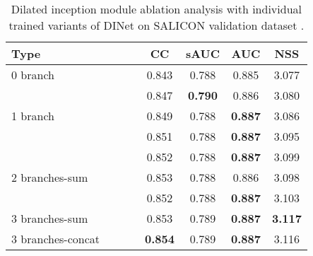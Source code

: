 \begin{table}[]
	\centering
	\scriptsize
	
	\caption{
Dilated inception module ablation analysis with individual trained variants of DINet on SALICON validation dataset \cite{jiang2015salicon}.
	} 
	\label{table:dimaa2}
	\begin{tabular}{|l|ccc|cccc|}
		\hline
		Type                            &  &  & & CC    & sAUC  & AUC   & NSS   \\ \hline
		0 branch                &    &    &    &  0.843  & 0.788 & 0.885 & 3.077 \\ \hline
		
		\multirow{3}{*}{1 branch}       & \checkmark   &    &    & 0.847 & \textbf{0.790}  & 0.886 & 3.080  \\ \cline{2-8} 
		&    & \checkmark   &    & 0.849 & 0.788 & \textbf{0.887} & 3.086 \\ \cline{2-8} 
		&    &    & \checkmark   & 0.851 & 0.788 & \textbf{0.887} & 3.095 \\ \hline
		\multirow{3}{*}{2 branches-sum} & \checkmark   & \checkmark   &    & 0.852 & 0.788 & \textbf{0.887} & 3.099 \\ \cline{2-8} 
		& \checkmark   &    & \checkmark   & 0.853 & 0.788 & 0.886 & 3.098 \\ \cline{2-8} 
		&    & \checkmark   & \checkmark   & 0.852 & 0.788 & \textbf{0.887} & 3.103 \\ \hline
		3 branches-sum                  & \checkmark   & \checkmark   & \checkmark   & 0.853 & 0.789 & \textbf{0.887} & \textbf{3.117} \\ \hline
		3 branches-concat               & \checkmark   & \checkmark   & \checkmark   & \textbf{0.854} & 0.789 & \textbf{0.887} & 3.116 \\ \hline 
\end{tabular}
\vspace{-4mm}
\end{table}



